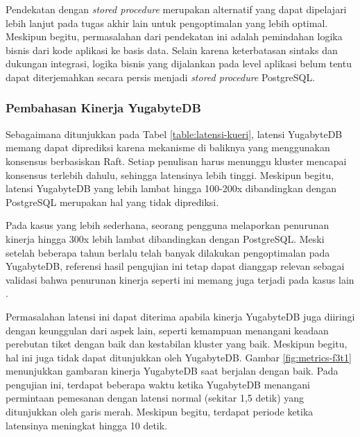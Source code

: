 Pendekatan dengan \textit{stored procedure} merupakan alternatif yang dapat dipelajari lebih lanjut pada tugas akhir lain untuk pengoptimalan yang lebih optimal. Meskipun begitu, permasalahan dari pendekatan ini adalah pemindahan logika bisnis dari kode aplikasi ke basis data. Selain karena keterbatasan sintaks dan dukungan integrasi, logika bisnis yang dijalankan pada level aplikasi belum tentu dapat diterjemahkan secara persis menjadi \textit{stored procedure} PostgreSQL.

\subsubsection{Pembahasan Kinerja YugabyteDB}

Sebagaimana ditunjukkan pada Tabel \ref{table:latensi-kueri}, latensi YugabyteDB memang dapat diprediksi karena mekanisme di baliknya yang menggunakan konsensus berbasiskan Raft. Setiap penulisan harus menunggu kluster mencapai konsensus terlebih dahulu, sehingga latensinya lebih tinggi. Meskipun begitu, latensi YugabyteDB yang lebih lambat hingga 100-200x dibandingkan dengan PostgreSQL merupakan hal yang tidak diprediksi.

Pada kasus yang lebih sederhana, seorang pengguna melaporkan penurunan kinerja hingga 300x lebih lambat dibandingkan dengan PostgreSQL. Meski setelah beberapa tahun berlalu telah banyak dilakukan pengoptimalan pada YugabyteDB, referensi hasil pengujian ini tetap dapat dianggap relevan sebagai validasi bahwa penurunan kinerja seperti ini memang juga terjadi pada kasus lain \parencite{yugabyteIssuePerformance}.

Permasalahan latensi ini dapat diterima apabila kinerja YugabyteDB juga diiringi dengan keunggulan dari aspek lain, seperti kemampuan menangani keadaan perebutan tiket dengan baik dan kestabilan kluster yang baik. Meskipun begitu, hal ini juga tidak dapat ditunjukkan oleh YugabyteDB. Gambar \ref{fig:metrics-f3t1} menunjukkan gambaran kinerja YugabyteDB saat berjalan dengan baik. Pada pengujian ini, terdapat beberapa waktu ketika YugabyteDB menangani permintaan pemesanan dengan latensi normal (sekitar 1,5 detik) yang ditunjukkan oleh garis merah. Meskipun begitu, terdapat periode ketika latensinya meningkat hingga 10 detik.

